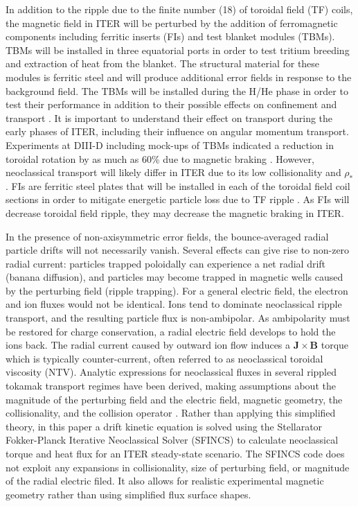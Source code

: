 \documentclass{article}
\numberwithin{figure}{section}
\numberwithin{equation}{section}
\begin{document}
In addition to the ripple due to the finite number (18) of toroidal field (TF) coils, the magnetic field in ITER will be perturbed by the addition of ferromagnetic components including ferritic inserts (FIs) and test blanket modules (TBMs). TBMs will be installed in three equatorial ports in order to test tritium breeding and extraction of heat from the blanket. The structural material for these modules is ferritic steel and will produce additional error fields in response to the background field. The TBMs will be installed during the H/He phase in order to test their performance in addition to their possible effects on confinement and transport \cite{Chuyanov2010}. It is important to understand their effect on transport during the early phases of ITER, including their influence on angular momentum transport. Experiments at DIII-D including mock-ups of TBMs indicated a reduction in toroidal rotation by as much as 60\% due to magnetic braking \cite{Schaffer2011}. However, neoclassical transport will likely differ in ITER due to its low collisionality and $\rho_*$. FIs are ferritic steel plates that will be installed in each of the toroidal field coil sections in order to mitigate energetic particle loss due to TF ripple \cite{Tobita2003}. As FIs will decrease toroidal field ripple, they may decrease the magnetic braking in ITER. 

In the presence of non-axisymmetric error fields, the bounce-averaged radial particle drifts will not necessarily vanish. Several effects can give rise to non-zero radial current: particles trapped poloidally can experience a net radial drift (banana diffusion), and particles may become trapped in magnetic wells caused by the perturbing field (ripple trapping). For a general electric field, the electron and ion fluxes would not be identical. Ions tend to dominate neoclassical ripple transport, and the resulting particle flux is non-ambipolar. As ambipolarity must be restored for charge conservation, a radial electric field develops to hold the ions back. The radial current caused by outward ion flow induces a $\bm{J} \times \bm{B}$ torque which is typically counter-current, often referred to as neoclassical toroidal viscosity (NTV). Analytic expressions for neoclassical fluxes in several rippled tokamak transport regimes have been derived, making assumptions about the magnitude of the perturbing field and the electric field, magnetic geometry, the collisionality, and the collision operator \cite{Shaing2003, Shaing2008, Shaing2010}. Rather than applying this simplified theory, in this paper a drift kinetic equation is solved using the Stellarator Fokker-Planck Iterative Neoclassical Solver (SFINCS) \cite{Landreman2014} to calculate neoclassical torque and heat flux for an ITER steady-state scenario. The SFINCS code does not exploit any expansions in collisionality, size of perturbing field, or magnitude of the radial electric filed. It also allows for realistic experimental magnetic geometry rather than using simplified flux surface shapes. 
\end{document}
